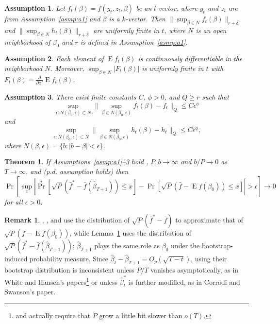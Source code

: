 \documentclass[12pt]{article}
\newtheorem{thm}{Theorem}
\newtheorem{asmp}{Assumption}[section]
\theoremstyle{definition}
\newtheorem{rem}{Remark}
\DeclareMathOperator{\E}{E}
\DeclareMathOperator{\pr}{Pr}
\newcommand{\dd}[1]{\frac{\partial}{\partial #1}}
\begin{document}
\begin{asmp}\label{asmp:a3}
  Let $f_{t}(\beta) = f(y_{t}, z_{t}, \beta)$ be an $l$-vector, where
  $y_{t}$ and $z_{t}$ are from Assumption~\ref{asmp:a1} and $\beta$ is
  a $k$-vector.  Then $\| \sup_{\beta \in N} f_{t}(\beta)
  \|_{r+\delta}$ and $\| \sup_{\beta \in N} h_{t}(\beta)
  \|_{r+\delta}$ are uniformly finite in $t$, where $N$ is an open
  neighborhood of $\beta_{0}$ and $r$ is defined in
  Assumption~\ref{asmp:a1}.
\end{asmp}

\begin{asmp}\label{asmp:a4}
  Each element of $\E f_{t}(\beta)$ is continuously differentiable in
  the neighborhood $N$.  Moreover, $\sup_{\beta \in N} |
  F_{t}(\beta) |$ is uniformly finite in $t$ with
  $F_{t}(\beta) = \dd{\beta'} \E f_{t}(\beta)$.
\end{asmp}

\begin{asmp}\label{asmp:a5}
  There exist finite constants $C$, $\phi > 0$, and $Q \geq r$ such
  that \[\sup_{\epsilon : N(\beta_{0}, \epsilon) \subset N}\|
  \sup_{\beta \in N(\beta_{0}, \epsilon)} f_{t}(\beta) -
  f_{t} \|_Q \leq C \epsilon^{\phi}\]
  and \[\sup_{\epsilon : N(\beta_{0}, \epsilon) \subset N}\|
  \sup_{\beta \in N(\beta_{0}, \epsilon)} h_{t}(\beta) -
  h_{t} \|_Q \leq C \epsilon^{\phi},\] where $N(\beta, \epsilon) =
  \{b : |b - \beta| < \epsilon\}$.
\end{asmp}

\begin{thm}\label{res:3}
  If Assumptions~\ref{asmp:a1}--\ref{asmp:a5} hold , $P, b \to \infty$
  and $b/P \to 0$ as $T \to \infty$, and (p.d. assumption holds) then
  \begin{equation}
    \pr[\sup_x | \pr^*[\sqrt{P} (\bar{f}^* - \bar{f}(\hat{\beta}_{T+1}))
        \leq x] - \pr[\sqrt{P}( \bar{f} - \E f(\beta_0)) \leq x] | >
      \epsilon] \to 0
  \end{equation}
  for all $\epsilon > 0$.
\end{thm}

\begin{rem}
  \citet{Whi:00}, \citet{Han:05}, and \citet{CoS:07} use the
  distribution of $\sqrt{P}(\bar{f}^{*} - \bar{f})$ to approximate
  that of $\sqrt{P}(\bar{f} - \E \bar{f}(\beta_0))$, while
  Lemma~\ref{res:3} uses the distribution of $\sqrt{P}(\bar{f}^{*} -
  \bar{f}(\hat{\beta}_{T+1}))$; $\hat{\beta}_{T+1}$ plays the same
  role as $\beta_0$ under the bootstrap-induced probability measure.
  Since $\hat{\beta}_t - \hat{\beta}_{T+1} = O_p(\sqrt{T-t})$, using
  their bootstrap distribution is inconsistent unless $P/T$ vanishes
  asymptotically, as in White and Hansen's
  papers\footnote{\citet{Whi:00} and \citet{Han:05} actually require
    that $P$ grow a little bit slower than $o(T)$.} or unless
  $\hat{\beta}_t^{*}$ is further modified, as in Corradi and Swanson's
  paper.
\end{rem}
\end{document}

